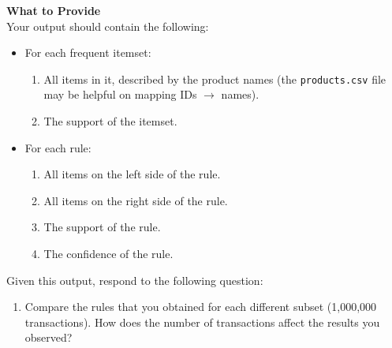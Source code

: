 \documentclass[paper=a4, fontsize=11pt]{scrartcl} %
\numberwithin{equation}{section} %
\numberwithin{figure}{section} %
\numberwithin{table}{section} %
\begin{document}
\textbf{What to Provide}\\
Your output should contain the following:
\begin{itemize}
\item For each frequent itemset:
\begin{enumerate}
	\item All items in it, described by the product names (the \texttt{products.csv} file may be helpful on mapping IDs $\rightarrow$ names).
    \item The support of the itemset.
\end{enumerate}
\item For each rule:
\begin{enumerate}
	\item All items on the left side of the rule.
    \item All items on the right side of the rule.
    \item The support of the rule.
    \item The confidence of the rule.
\end{enumerate}
\end{itemize}
Given this output, respond to the following question:
\begin{enumerate}
	\item Compare the rules that you obtained for each different subset (1,000,000 transactions). How does the number of transactions affect the results you observed?
\end{enumerate}

\vspace{64pt}
\end{document}
